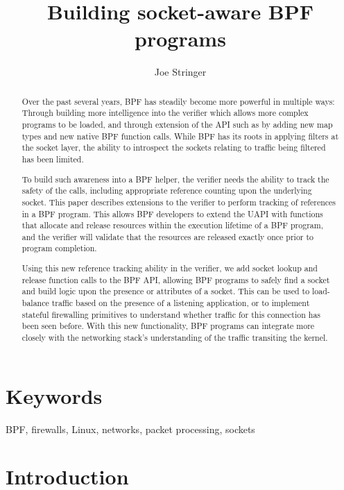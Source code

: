 \documentclass[10pt,sigconf,authorversion]{lpc}
\title{Building socket-aware BPF programs}
\author{Joe Stringer}
\affiliation{%
      \institution{Cilium.io}}
\begin{document}
\begin{abstract}

    Over the past several years, BPF has steadily become more powerful in
    multiple ways: Through building more intelligence into the verifier which
    allows more complex programs to be loaded, and through extension of the API
    such as by adding new map types and new native BPF function calls. While
    BPF has its roots in applying filters at the socket layer, the ability to
    introspect the sockets relating to traffic being filtered has been limited.

    To build such awareness into a BPF helper, the verifier needs the ability
    to track the safety of the calls, including appropriate reference counting
    upon the underlying socket. This paper describes extensions to the verifier
    to perform tracking of references in a BPF program. This allows BPF
    developers to extend the UAPI with functions that allocate and release
    resources within the execution lifetime of a BPF program, and the verifier
    will validate that the resources are released exactly once prior to program
    completion.

    Using this new reference tracking ability in the verifier, we add socket
    lookup and release function calls to the BPF API, allowing BPF programs to
    safely find a socket and build logic upon the presence or attributes of a
    socket. This can be used to load-balance traffic based on the presence of a
    listening application, or to implement stateful firewalling primitives to
    understand whether traffic for this connection has been seen before. With
    this new functionality, BPF programs can integrate more closely with the
    networking stack's understanding of the traffic transiting the kernel.

\end{abstract}

\maketitle

\section{Keywords}

BPF, firewalls, Linux, networks, packet processing, sockets

\section{Introduction}
\end{document}

